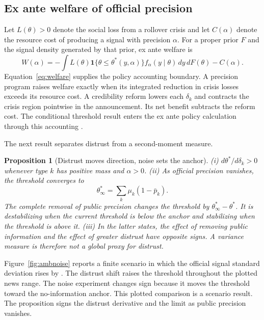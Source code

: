 \documentclass[11pt]{article}
\newtheorem{proposition}{Proposition}
\theoremstyle{definition}
\newcommand{\one}{\mathbf{1}}
\begin{document}
\subsection{Ex ante welfare of official precision}\label{sec:welfare}

Let $L(\theta)>0$ denote the social loss from a rollover crisis and let $C(\alpha)$ denote the resource cost of producing a signal with precision $\alpha$. For a proper prior $F$ and the signal density generated by that prior, ex ante welfare is
\begin{equation}
W(\alpha)
=-\int L(\theta)\one\{\theta\leq\theta^*(y,\alpha)\}
f_\alpha(y\mid\theta)\,d y\,dF(\theta)-C(\alpha).
\label{eq:welfare}
\end{equation}
Equation~\eqref{eq:welfare} supplies the policy accounting boundary. A precision program raises welfare exactly when its integrated reduction in crisis losses exceeds its resource cost. A credibility reform lowers each $\delta_k$ and contracts the crisis region pointwise in the announcement. Its net benefit subtracts the reform cost. The conditional threshold result enters the ex ante policy calculation through this accounting \citep{AngeletosPavan2007}.

The next result separates distrust from a second-moment measure.

\begin{proposition}[Distrust moves direction, noise sets the anchor]\label{prop:directional}
(i) $d\theta^*/d\delta_k>0$ whenever type $k$ has positive mass and $\alpha>0$. (ii) As official precision vanishes, the threshold converges to
\[
\theta^*_\infty=\sum_k\mu_k(1-\bar p_k).
\]
The complete removal of public precision changes the threshold by $\theta^*_\infty-\theta^*$. It is destabilizing when the current threshold is below the anchor and stabilizing when the threshold is above it. (iii) In the latter states, the effect of removing public information and the effect of greater distrust have opposite signs. A variance measure is therefore not a global proxy for distrust.
\end{proposition}

Figure~\ref{fig:ambnoise} reports a finite scenario in which the official signal standard deviation rises by \DelF. The distrust shift raises the threshold throughout the plotted news range. The noise experiment changes sign because it moves the threshold toward the no-information anchor. This plotted comparison is a scenario result. The proposition signs the distrust derivative and the limit as public precision vanishes.
\end{document}
